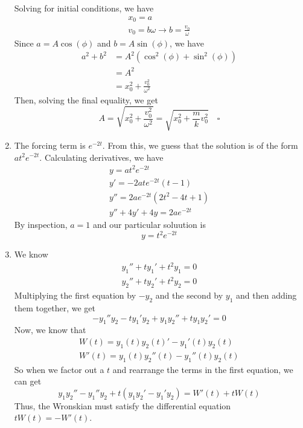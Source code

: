\documentclass[12pt]{article}
\begin{document}
\begin{enumerate}
          Solving for initial conditions, we have
          \begin{gather*}
              x_0=a \\
              v_0=b\omega \rightarrow b=\frac{v_0}{\omega}
          \end{gather*}
          Since $a=A\cos(\phi)$ and $b=A\sin(\phi)$, we have
          \begin{align*}
              a^2+b^2 & =A^2\left(\cos^2(\phi)+\sin^2(\phi)\right) \\
                      & =A^2                                       \\
                      & =x_0^2+\frac{v_0^2}{\omega^2}
          \end{align*}
          Then, solving the final equality, we get
          \[A=\sqrt{x_0^2+\frac{v_0^2}{\omega^2}}=\sqrt{x_0^2+\frac{m}{k}v_0^2}\quad\square\]
    \item The forcing term is $e^{-2t}$.
          From this, we guess that the solution is of the form $at^2e^{-2t}$.
          Calculating derivatives, we have \begin{gather*}
              y=at^2e^{-2t} \\
              y'=-2ate^{-2t}(t-1) \\
              y''=2ae^{-2t}\left(2t^2-4t+1\right) \\
              y''+4y'+4y=2ae^{-2t}
          \end{gather*}
          By inspection, $a=1$ and our particular soluution is
          \[\boxed{y=t^2e^{-2t}}\]
    \item We know \begin{gather*}
              y_1''+ty_1'+t^2y_1=0 \\
              y_2''+ty_2'+t^2y_2=0
          \end{gather*}
          Multiplying the first equation by $-y_2$ and the second by $y_1$ and then adding them together, we get
          \[-y_1''y_2-ty_1'y_2+y_1y_2''+ty_1y_2'=0\]
          Now, we know that
          \begin{gather*}
              W(t)=y_1(t)y_2(t)'-y_1'(t)y_2(t) \\
              W'(t)=y_1(t)y_2''(t)-y_1''(t)y_2(t)
          \end{gather*}
          So when we factor out a $t$ and rearrange the terms in the first equation, we can get
          \[y_1y_2''-y_1''y_2+t(y_1y_2'-y_1'y_2)=W'(t)+tW(t)\]
          Thus, the Wronskian must satisfy the differential equation $\boxed{tW(t)=-W'(t)}$.

\end{enumerate}
\end{document}
